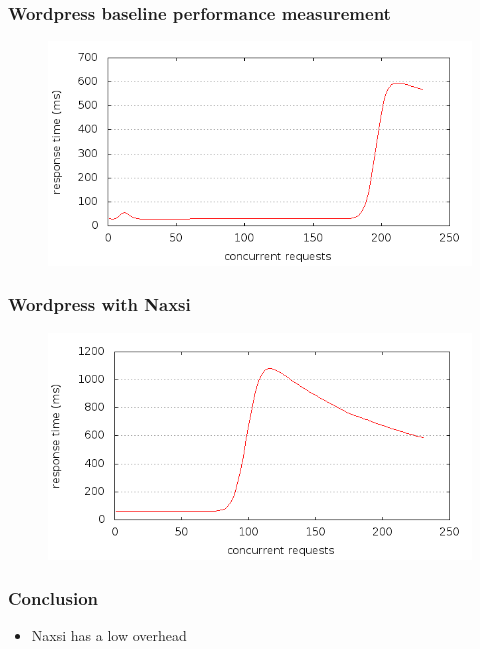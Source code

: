 \begin{frame}[noframenumbering]
  \frametitle{Wordpress baseline performance measurement}
  \begin{figure}[H]
  \centering
  \includegraphics[scale=0.5] {../paper/images/results/baseline_wp/output.png}
  \end{figure}
\end{frame}

\begin{frame}[noframenumbering]
  \frametitle{Wordpress with Naxsi}
  \begin{figure}[H]
  \centering
  \includegraphics[scale=0.5] {../paper/images/results/wp_with_naxsi_1_to_230_concurrent_connections/output.png}
  \end{figure}
\end{frame}  
  
\begin{frame}[noframenumbering]
  \frametitle{Conclusion}
  \begin{itemize}
    \item Naxsi has a low overhead
  \end{itemize}
\end{frame}